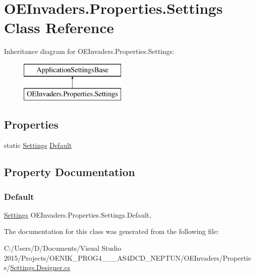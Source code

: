 \hypertarget{class_o_e_invaders_1_1_properties_1_1_settings}{}\section{O\+E\+Invaders.\+Properties.\+Settings Class Reference}
\label{class_o_e_invaders_1_1_properties_1_1_settings}
Inheritance diagram for O\+E\+Invaders.\+Properties.\+Settings\+:\begin{figure}[H]
\begin{center}
\leavevmode
\includegraphics[height=2.000000cm]{class_o_e_invaders_1_1_properties_1_1_settings}
\end{center}
\end{figure}
\subsection*{Properties}
\begin{DoxyCompactItemize}
\item 
static \mbox{\hyperlink{class_o_e_invaders_1_1_properties_1_1_settings}{Settings}} \mbox{\hyperlink{class_o_e_invaders_1_1_properties_1_1_settings_a342f76e5057a2f20a2a0f22f1275df03}{Default}}
\end{DoxyCompactItemize}


\subsection{Property Documentation}
\mbox{\label{class_o_e_invaders_1_1_properties_1_1_settings_a342f76e5057a2f20a2a0f22f1275df03}} 
\subsubsection{\texorpdfstring{Default}{Default}}
{\footnotesize\ttfamily \mbox{\hyperlink{class_o_e_invaders_1_1_properties_1_1_settings}{Settings}} O\+E\+Invaders.\+Properties.\+Settings.\+Default\hspace{0.3cm}{\ttfamily [static]}, {\ttfamily [get]}}



The documentation for this class was generated from the following file\+:\begin{DoxyCompactItemize}
\item 
C\+:/\+Users/\+D/\+Documents/\+Visual Studio 2015/\+Projects/\+O\+E\+N\+I\+K\+\_\+\+P\+R\+O\+G4\+\_\+\_\+\_\+\+A\+S4\+D\+C\+D\+\_\+\+N\+E\+P\+T\+U\+N/\+O\+E\+Invaders/\+Properties/\mbox{\hyperlink{_settings_8_designer_8cs}{Settings.\+Designer.\+cs}}\end{DoxyCompactItemize}
